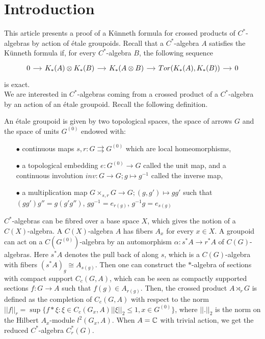 \section{Introduction}

This article presents a proof of a Künneth formula for crossed products of $C^*$-algebras by action of \'etale groupoids. Recall that a $C^*$-algebra $A$ satisfies the Künneth formula if, for every $C^*$-algebra $B$, the following sequence 
\[\begin{tikzcd}[column sep = small] 
0 \arrow{r} & K_*(A)\otimes K_*(B)\arrow{r} & K_*(A\otimes B) \arrow{r} & Tor(K_*(A),K_*(B))\arrow{r} & 0 
\end{tikzcd}\]
is exact. \\

We are interested in $C^*$-algebras coming from a crossed product of a $C^*$-algebra by an action of an \'etale groupoid. Recall the following definition.

\begin{definition}
An étale groupoid is given by two topological spaces, the space of arrows $G$ and the space of units $G^{(0)}$ endowed with:
\begin{itemize}
\item[$\bullet$] continuous maps $s,r : G \rightrightarrows G^{(0)}$ which are local homeomorphisms,
\item[$\bullet$] a topological embedding $e: G^{(0)}\rightarrow G$ called the unit map, and a continuous involution $inv : G\rightarrow G; g\mapsto g^{-1}$ called the inverse map,
\item[$\bullet$] a multiplication map $G\times_{s,r}G\rightarrow G; (g,g')\mapsto gg'$ such that $(gg')g'' = g(g'g'')$, $gg^{-1}= e_{r(g)}$, $g^{-1}g= e_{s(g)}$
\end{itemize}
\end{definition}

$C^*$-algebras can be fibred over a base space $X$, which gives the notion of a $C(X)$-algebra. A $C(X)$-algebra $A$ has fibers $A_x$ for every $x\in X$. A groupoid can act on a $C(G^{(0)})$-algebra by an automorphism $\alpha : s^* A \rightarrow r^* A $ of $C(G)$-algebras. Here $s^* A$ denotes the pull back of along $s$, which is a $C(G)$-algebra with fibers $(s^* A)_g \cong A_{s(g)}$. Then one can construct the $*$-algebra of sections with compact support $C_c(G,A)$, which can be seen as compactly supported sections $f : G \rightarrow A$ such that $f(g)\in A_{r(g)}$. Then, the crossed product $A\rtimes_r G$ is defined as the completion of $C_c(G,A)$ with respect to the norm $||f||_r =\sup \{f \ast \xi : \xi \in C_c(G_x,A)||\xi||_2\leq 1,x\in G^{(0)}\}$, where $||.||_2$ is the norm on the Hilbert $A_x$-module $l^2(G_x,A)$. When $A= \mathbb C$ with trivial action, we get the reduced $C^*$-algebra $C^*_r(G)$.\\
 
